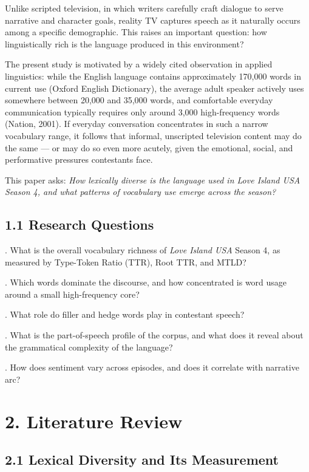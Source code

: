\documentclass[11pt]{article}
\begin{document}
Unlike scripted television, in which writers carefully craft dialogue to serve narrative and character goals, reality TV captures speech as it naturally occurs among a specific demographic. This raises an important question: how linguistically rich is the language produced in this environment?

The present study is motivated by a widely cited observation in applied linguistics: while the English language contains approximately 170,000 words in current use (Oxford English Dictionary), the average adult speaker actively uses somewhere between 20,000 and 35,000 words, and comfortable everyday communication typically requires only around 3,000 high-frequency words (Nation, 2001). If everyday conversation concentrates in such a narrow vocabulary range, it follows that informal, unscripted television content may do the same --- or may do so even more acutely, given the emotional, social, and performative pressures contestants face.

This paper asks: \emph{How lexically diverse is the language used in Love Island USA Season 4, and what patterns of vocabulary use emerge across the season?}

\subsection*{1.1 Research Questions}

\par{}. What is the overall vocabulary richness of \emph{Love Island USA} Season 4, as measured by Type-Token Ratio (TTR), Root TTR, and MTLD?
\par{}. Which words dominate the discourse, and how concentrated is word usage around a small high-frequency core?
\par{}. What role do filler and hedge words play in contestant speech?
\par{}. What is the part-of-speech profile of the corpus, and what does it reveal about the grammatical complexity of the language?
\par{}. How does sentiment vary across episodes, and does it correlate with narrative arc?


\section*{2. Literature Review}

\subsection*{2.1 Lexical Diversity and Its Measurement}
\end{document}
